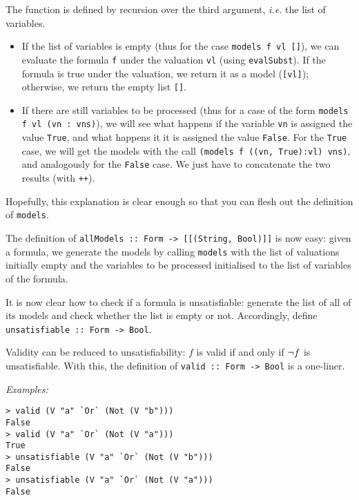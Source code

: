 \documentclass[english]{article}
\begin{document}
The function is defined by recursion over the third argument,
\emph{i.e.} the list of variables.
\begin{itemize}
\item If the list of variables is empty (thus for the case \texttt{models f vl
    []}), we can evaluate the formula \texttt{f} under the valuation
  \texttt{vl} (using \texttt{evalSubst}). If the formula is true under the
  valuation, we return it as a model (\texttt{[vl]}); otherwise, we return the
  empty list \texttt{[]}. 
\item If there are still variables to be processed (thus for a case of the
  form \texttt{models f vl (vn : vns)}), we will see what happens if the
  variable \texttt{vn} is assigned the value \texttt{True}, and what happens
  it it is assigned the value \texttt{False}. For the \texttt{True} case, we
  will get the models with the call \texttt{(models f ((vn, True):vl) vns)},
  and analogously for the \texttt{False} case. We just have to concatenate the
  two results (with \texttt{++}). 
\end{itemize}

\begin{exo}\label{exo:models}
Hopefully, this explanation is clear enough so that you can flesh out the
definition of \texttt{models}.
\end{exo}

\begin{exo}\label{exo:allModels}
The definition of \texttt{allModels :: Form -> [[(String, Bool)]]} is now
easy: given a formula, we generate the models by calling \texttt{models} with
the list of valuations initially empty and the variables to be processed
initialised to the list of variables of the formula.
\end{exo}

\begin{exo}\label{exo:unsatisfiable}
  It is now clear how to check if a formula is unsatisfiable: generate the
  list of all of its models and check whether the list is empty or
  not. Accordingly, define \texttt{unsatisfiable :: Form -> Bool}.
\end{exo}

\begin{exo}\label{exo:valid}
Validity can be reduced to unsatisfiability: $f$ is valid if and only if $\lnot
f$ is unsatisfiable. With this, the definition of \texttt{valid :: Form ->
  Bool} is a one-liner.
\end{exo}


\noindent
\emph{Examples:}
\begin{lstlisting}
> valid (V "a" `Or` (Not (V "b")))
False
> valid (V "a" `Or` (Not (V "a")))
True
> unsatisfiable (V "a" `Or` (Not (V "b")))
False
> unsatisfiable (V "a" `Or` (Not (V "a")))
False
\end{lstlisting}
\end{document}
